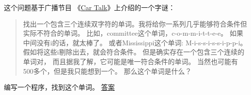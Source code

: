 \begin{exercise}
    


这个问题基于广播节目 《\href{http://www.cartalk.com/content/puzzlers}{Car Talk}》上介绍的一个字谜：


\begin{quote}
    找出一个包含三个连续双字符的单词。我将给你一系列几乎能够符合条件但实际不符合的单词。  
    比如，committee这个单词，c-o-m-m-i-t-t-e-e。  
    如果中间没有i的话，就太棒了。  
    或者Mississippi这个单词: M-i-s-s-i-s-s-i-p-p-i。  
    假如将这些i剔除出去，就会符合条件。  
    但是确实存在一个包含三个连续的单词对， 而且据我了解，它可能是唯一符合条件的单词。  
    当然也可能有500多个，但是我只能想到一个。  
    那么这个单词是什么？
\end{quote}


编写一个程序，找到这个单词。
\href{http://thinkpython2.com/code/cartalk1.py}{答案}

\end{exercise}


